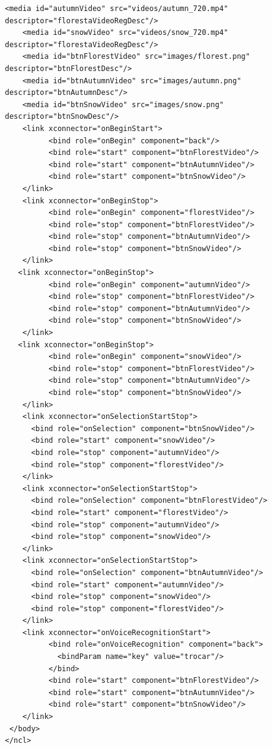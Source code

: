 \begin{lstlisting}[language=ncl,label=lst:appIntMultModal, caption={Código da aplicação NCL com interação multimodal.}]
    <media id="autumnVideo" src="videos/autumn_720.mp4" descriptor="florestaVideoRegDesc"/>
    <media id="snowVideo" src="videos/snow_720.mp4" descriptor="florestaVideoRegDesc"/>
    <media id="btnFlorestVideo" src="images/florest.png" descriptor="btnFlorestDesc"/>
    <media id="btnAutumnVideo" src="images/autumn.png" descriptor="btnAutumnDesc"/>
    <media id="btnSnowVideo" src="images/snow.png" descriptor="btnSnowDesc"/>
    <link xconnector="onBeginStart">
          <bind role="onBegin" component="back"/>
          <bind role="start" component="btnFlorestVideo"/>
          <bind role="start" component="btnAutumnVideo"/>
          <bind role="start" component="btnSnowVideo"/>
    </link> 
    <link xconnector="onBeginStop">
          <bind role="onBegin" component="florestVideo"/>
          <bind role="stop" component="btnFlorestVideo"/>
          <bind role="stop" component="btnAutumnVideo"/>
          <bind role="stop" component="btnSnowVideo"/>
    </link> 
   <link xconnector="onBeginStop">
          <bind role="onBegin" component="autumnVideo"/>
          <bind role="stop" component="btnFlorestVideo"/>
          <bind role="stop" component="btnAutumnVideo"/>
          <bind role="stop" component="btnSnowVideo"/>
    </link> 
   <link xconnector="onBeginStop">
          <bind role="onBegin" component="snowVideo"/>
          <bind role="stop" component="btnFlorestVideo"/>
          <bind role="stop" component="btnAutumnVideo"/>
          <bind role="stop" component="btnSnowVideo"/>
    </link> 
    <link xconnector="onSelectionStartStop">
      <bind role="onSelection" component="btnSnowVideo"/>
      <bind role="start" component="snowVideo"/>
      <bind role="stop" component="autumnVideo"/>
      <bind role="stop" component="florestVideo"/>
    </link> 
    <link xconnector="onSelectionStartStop">
      <bind role="onSelection" component="btnFlorestVideo"/>
      <bind role="start" component="florestVideo"/>
      <bind role="stop" component="autumnVideo"/>
      <bind role="stop" component="snowVideo"/>
    </link> 
    <link xconnector="onSelectionStartStop">
      <bind role="onSelection" component="btnAutumnVideo"/>
      <bind role="start" component="autumnVideo"/>
      <bind role="stop" component="snowVideo"/>
      <bind role="stop" component="florestVideo"/>
    </link>  
    <link xconnector="onVoiceRecognitionStart">
          <bind role="onVoiceRecognition" component="back">
            <bindParam name="key" value="trocar"/>
          </bind>
          <bind role="start" component="btnFlorestVideo"/>
          <bind role="start" component="btnAutumnVideo"/>
          <bind role="start" component="btnSnowVideo"/>
    </link> 
 </body>
</ncl>
\end{lstlisting}

